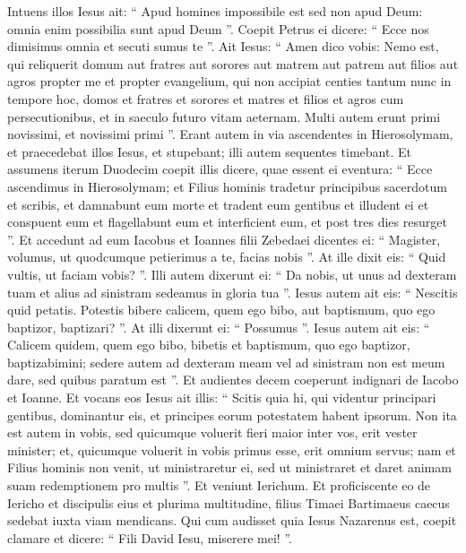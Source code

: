 \begin{biblechapter}
\begin{biblechapter}
\begin{biblechapter}
\begin{biblechapter}
\begin{biblechapter}
\begin{biblechapter}
\begin{biblechapter}
\begin{biblechapter}
\begin{biblechapter}
\begin{biblechapter}
\verse Intuens illos Iesus ait: “ Apud homines impossibile est sed non apud Deum: omnia enim possibilia sunt apud Deum ”.
 \verse Coepit Petrus ei dicere: “ Ecce nos dimisimus omnia et secuti sumus te ”. 
\verse Ait Iesus: “ Amen dico vobis: Nemo est, qui reliquerit domum aut fratres aut sorores aut matrem aut patrem aut filios aut agros propter me et propter evangelium, 
\verse qui non accipiat centies tantum nunc in tempore hoc, domos et fratres et sorores et matres et filios et agros cum persecutionibus, et in saeculo futuro vitam aeternam. 
\verse Multi autem erunt primi novissimi, et novissimi primi ”.
 \verse Erant autem in via ascendentes in Hierosolymam, et praecedebat illos Iesus, et stupebant; illi autem sequentes timebant. Et assumens iterum Duodecim coepit illis dicere, quae essent ei eventura: 
\verse “ Ecce ascendimus in Hierosolymam; et Filius hominis tradetur principibus sacerdotum et scribis, et damnabunt eum morte et tradent eum gentibus 
\verse et illudent ei et conspuent eum et flagellabunt eum et interficient eum, et post tres dies resurget ”.
 \verse Et accedunt ad eum Iacobus et Ioannes filii Zebedaei dicentes ei: “ Magister, volumus, ut quodcumque petierimus a te, facias nobis ”. 
\verse At ille dixit eis: “ Quid vultis, ut faciam vobis? ”. 
\verse Illi autem dixerunt ei: “ Da nobis, ut unus ad dexteram tuam et alius ad sinistram sedeamus in gloria tua ”. 
 \verse Iesus autem ait eis: “ Nescitis quid petatis. Potestis bibere calicem, quem ego bibo, aut baptismum, quo ego baptizor, baptizari? ”. 
\verse At illi dixerunt ei: “ Possumus ”. Iesus autem ait eis: “ Calicem quidem, quem ego bibo, bibetis et baptismum, quo ego baptizor, baptizabimini; 
\verse sedere autem ad dexteram meam vel ad sinistram non est meum dare, sed quibus paratum est ”.
 \verse Et audientes decem coeperunt indignari de Iacobo et Ioanne. 
\verse Et vocans eos Iesus ait illis: “ Scitis quia hi, qui videntur principari gentibus, dominantur eis, et principes eorum potestatem habent ipsorum. 
\verse Non ita est autem in vobis, sed quicumque voluerit fieri maior inter vos, erit vester minister; 
\verse et, quicumque voluerit in vobis primus esse, erit omnium servus; 
\verse nam et Filius hominis non venit, ut ministraretur ei, sed ut ministraret et daret animam suam redemptionem pro multis ”.
 \verse Et veniunt Ierichum. Et proficiscente eo de Iericho et discipulis eius et plurima multitudine, filius Timaei Bartimaeus caecus sedebat iuxta viam mendicans. 
\verse Qui cum audisset quia Iesus Nazarenus est, coepit clamare et dicere: “ Fili David Iesu, miserere mei! ”. 

\end{biblechapter}
\end{biblechapter}
\end{biblechapter}
\end{biblechapter}
\end{biblechapter}
\end{biblechapter}
\end{biblechapter}
\end{biblechapter}
\end{biblechapter}
\end{biblechapter}
